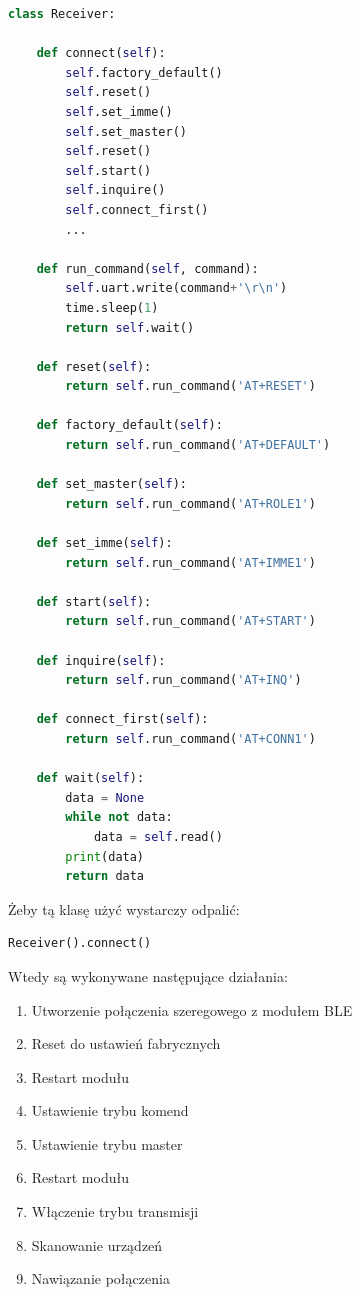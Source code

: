 \documentclass[eng,printmode]{mgr}
\begin{document}
\begin{lstlisting}[language=Python]
class Receiver:

    def connect(self):
        self.factory_default()
        self.reset()
        self.set_imme()
        self.set_master()
        self.reset()
        self.start()
        self.inquire()
        self.connect_first()
        ...

    def run_command(self, command):
        self.uart.write(command+'\r\n')
        time.sleep(1)
        return self.wait()

    def reset(self):
        return self.run_command('AT+RESET')

    def factory_default(self):
        return self.run_command('AT+DEFAULT')

    def set_master(self):
        return self.run_command('AT+ROLE1')

    def set_imme(self):
        return self.run_command('AT+IMME1')

    def start(self):
        return self.run_command('AT+START')

    def inquire(self):
        return self.run_command('AT+INQ')

    def connect_first(self):
        return self.run_command('AT+CONN1')

    def wait(self):
        data = None
        while not data:
            data = self.read()
        print(data)
        return data
\end{lstlisting}

Żeby tą klasę użyć wystarczy odpalić:

\begin{lstlisting}[language=Python]
Receiver().connect()
\end{lstlisting}

Wtedy są wykonywane następujące działania:

\begin{enumerate}
\item Utworzenie połączenia szeregowego z modułem BLE	
\item Reset do ustawień fabrycznych
\item Restart modułu
\item Ustawienie trybu komend
\item Ustawienie trybu master
\item Restart modułu
\item Włączenie trybu transmisji
\item Skanowanie urządzeń
\item Nawiązanie połączenia
\end{enumerate}
\end{document}
